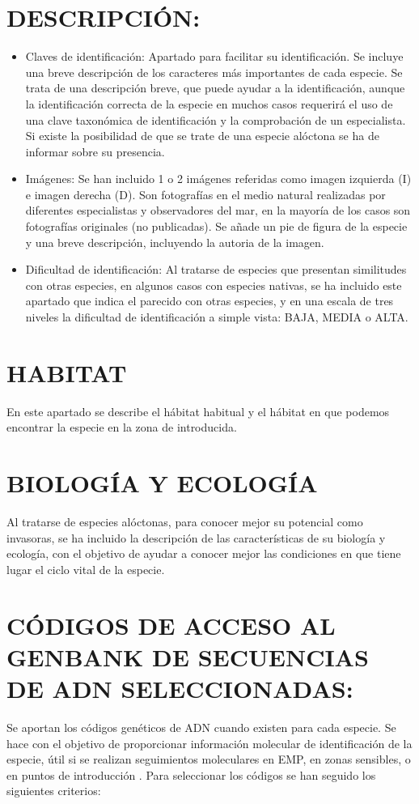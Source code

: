 \documentclass{article}
\begin{document}
\section*{DESCRIPCIÓN:}
\begin{itemize}
\item Claves de identificación: Apartado para facilitar su identificación. Se incluye una breve descripción de los caracteres más importantes de cada especie. Se trata de una descripción breve, que puede ayudar a la identificación, aunque la identificación correcta de la especie en muchos casos requerirá el uso de una clave taxonómica de identificación y la comprobación de un especialista.  Si existe la posibilidad de que se trate de una especie alóctona se ha de informar sobre su presencia.
\item Imágenes: Se han incluido 1 o 2 imágenes referidas como imagen izquierda (I) e imagen derecha (D). Son fotografías en el medio natural realizadas por diferentes especialistas y observadores del mar, en la mayoría de los casos son fotografías originales (no publicadas).  Se añade un pie de figura de la especie y una breve descripción, incluyendo la autoria de la imagen. 
\item Dificultad de identificación: Al tratarse de especies que presentan similitudes con otras especies, en algunos casos con especies nativas, se ha incluido este apartado que indica el parecido con otras especies, y en una escala de tres niveles la dificultad de identificación a simple vista: BAJA, MEDIA o ALTA.
\end{itemize}


\section*{HABITAT}
En este apartado se describe el hábitat habitual  y el hábitat en que podemos encontrar la especie en la zona de introducida. 

\section*{BIOLOGÍA Y ECOLOGÍA}
Al tratarse de especies alóctonas, para conocer mejor su potencial como invasoras, se ha incluido la descripción de las características de su biología y ecología, con el objetivo de ayudar a conocer mejor las condiciones en que tiene lugar el ciclo vital de la especie. 

\section*{CÓDIGOS DE ACCESO AL GENBANK DE SECUENCIAS DE ADN SELECCIONADAS:} 
Se aportan los códigos genéticos de ADN  cuando existen para cada especie. Se hace con el objetivo de proporcionar información molecular de identificación de la especie, útil si se realizan seguimientos moleculares en EMP, en zonas sensibles, o en puntos de introducción \cite{17, 18}.
Para seleccionar los códigos se han seguido los siguientes criterios: 
\end{document}
